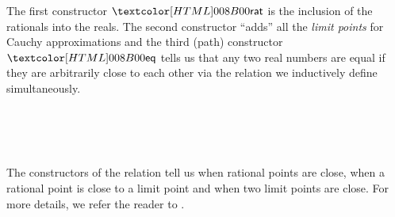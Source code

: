 The first constructor $\realrat$ is the inclusion of the rationals
into the reals. The second constructor ``adds'' all the \emph{limit
  points} for Cauchy approximations and the third (path) constructor
$\realeq$ tells us that any two real numbers are equal if they are
arbitrarily close to each other via the relation we inductively define
simultaneously.
%
\begin{datatype}{\realrel{\epsilon}{\_}{\_}}{}
   \\
   \\
   \\
\end{datatype}
%
The constructors of the relation tell us when rational points are
close, when a rational point is close to a limit point and when two
limit points are close. For more details, we refer the reader to
\cite{UFP2013}.

